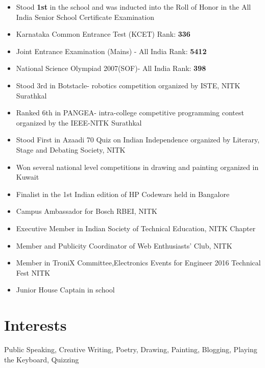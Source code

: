\documentclass[11pt,a4paper,roman]{moderncv}        %
\begin{document}
\begin{itemize}
	
\item{Stood \textbf{1st} in the school and was inducted into the Roll of Honor in the All India Senior School Certificate Examination}
\item{Karnataka Common Entrance Test (KCET) Rank: \textbf{336}}
\item{Joint Entrance Examination (Mains) - All India Rank: \textbf{5412}} 
\item{National Science Olympiad 2007(SOF)-  All India Rank: \textbf{398}}   
\item{Stood 3rd in Botstacle- robotics competition organized by ISTE, NITK Surathkal}
\item{Ranked 6th in PANGEA- intra-college competitive programming contest organized by the IEEE-NITK Surathkal}
\item{Stood First in Azaadi 70 Quiz on Indian Independence organized by Literary, Stage and Debating Society, NITK}
\item{Won several national level competitions in drawing and painting organized in Kuwait}
\item{Finalist in the 1st Indian edition of HP Codewars held in Bangalore}
\item{Campus Ambassador for Bosch RBEI, NITK}
\item{Executive Member in Indian Society of Technical Education, NITK Chapter}
\item{Member and Publicity Coordinator of Web Enthusiasts' Club, NITK}
\item{Member in TroniX Committee,Electronics Events for Engineer 2016 Technical Fest NITK}
\item{Junior House Captain in school}
\end{itemize}


\section{\small{Interests}}
Public Speaking, Creative Writing, Poetry, Drawing, Painting, Blogging, Playing the Keyboard, Quizzing



%


\clearpage
\end{document}
